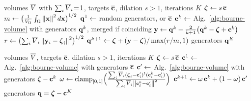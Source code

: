 \documentclass[main.tex]{subfiles}
\begin{document}
\begin{algorithm}[H]
  \caption{Projection--dilation fitting by \citet{Bourne2026ConvexOrder}, subgradient variant.}
  \label{alg:bourne2026-subgradient}
  \begin{algorithmic}[1]
    \Require volumes $\overline{V}$ with $\sum_i \overline{V}_i \!=\! 1$, targets $\overline{\mathbf{c}}$, dilation $s \!>\! 1$, iterations $K$
    \State $\boldsymbol{\zeta} \gets s\,\overline{\mathbf{c}}$ 
    \State $m \gets \bigl( \tfrac{1}{V_{\Omega}} \int_\Omega \left\lVert \mathbf{x} \right\rVert^2 d\mathbf{x} \bigr)^{1/2}$ 
    \State $\mathbf{q}^1 \gets$ random generators, or $\overline{\mathbf{c}}$
      \State $\mathbf{c}^k \gets$ Alg.~\ref{alg:bourne-volume} with generators $\mathbf{q}^k$, merged if coinciding
      \State $\mathbf{y} \gets \mathbf{q}^k - \tfrac{2}{k+1} \bigl( \mathbf{q}^k - \boldsymbol{\zeta} + \mathbf{c}^k \bigr)$ 
      \State $r \gets \bigl( \sum_i \overline{V}_i \left\lVert \mathbf{y}_i - \boldsymbol{\zeta}_i \right\rVert^2 \bigr)^{1/2}$
      \State $\mathbf{q}^{k+1} \gets \boldsymbol{\zeta} + (\mathbf{y} - \boldsymbol{\zeta}) / \max(r/m, 1)$ 
    \EndFor
    \State \Return generators $\mathbf{q}^{K}$
  \end{algorithmic}
\end{algorithm}

\begin{algorithm}[H]
  \caption{Projection--dilation fitting by \citet{Bourne2026ConvexOrder}, Frank--Wolfe variant.}
  \label{alg:bourne2026-fw}
  \begin{algorithmic}[1]
    \Require volumes $\overline{V}$, targets $\overline{\mathbf{c}}$, dilation $s \!>\! 1$, iterations $K$
    \State $\boldsymbol{\zeta} \gets s\,\overline{\mathbf{c}}$
    \State $\mathbf{c}^1 \gets$ Alg.~\ref{alg:bourne-volume} with generators $\overline{\mathbf{c}}$ 
      \State $\mathbf{c}' \gets$ Alg.~\ref{alg:bourne-volume} with generators $\boldsymbol{\zeta} - \mathbf{c}^k$ 
      \State $\omega \gets \operatorname{clamp}_{[0,1]} \Bigl( \frac{\sum_i \overline{V}_i (\boldsymbol{\zeta}_i - \mathbf{c}'_i)^{t} (\mathbf{c}^k_i - \mathbf{c}'_i)}{\sum_i \overline{V}_i \left\lVert \mathbf{c}^k_i - \mathbf{c}'_i \right\rVert^2} \Bigr)$ 
      \State $\mathbf{c}^{k+1} \gets \omega\,\mathbf{c}^k + (1 - \omega)\,\mathbf{c}'$
    \EndFor
    \State \Return generators $\mathbf{q} = \boldsymbol{\zeta} - \mathbf{c}^{K}$
  \end{algorithmic}
\end{algorithm}
\end{document}
